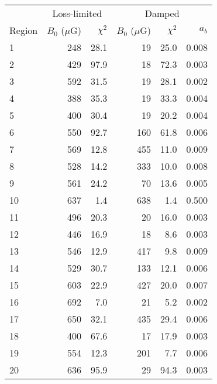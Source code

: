 \begin{tabular}{@{} l rr rrr @{}}
\toprule
{} & \multicolumn{2}{c}{Loss-limited}
   & \multicolumn{3}{c}{Damped} \\
\cmidrule(lr){2-3} \cmidrule(l){4-6}
Region & $B_0$ ($\mu$G) & $\chi^2$
       & $B_0$ ($\mu$G) & $\chi^2$ & $a_b$ \\
\midrule
 1 & 248 & 28.1 &  19 & 25.0 & 0.008 \\
 2 & 429 & 97.9 &  18 & 72.3 & 0.003 \\
 3 & 592 & 31.5 &  19 & 28.1 & 0.002 \\
\cmidrule{1-6}
 4 & 388 & 35.3 &  19 & 33.3 & 0.004 \\
 5 & 400 & 30.4 &  19 & 20.2 & 0.004 \\
 6 & 550 & 92.7 & 160 & 61.8 & 0.006 \\
 7 & 569 & 12.8 & 455 & 11.0 & 0.009 \\
 8 & 528 & 14.2 & 333 & 10.0 & 0.008 \\
 9 & 561 & 24.2 &  70 & 13.6 & 0.005 \\
10 & 637 &  1.4 & 638 &  1.4 & 0.500 \\
\cmidrule{1-6}
11 & 496 & 20.3 &  20 & 16.0 & 0.003 \\
12 & 446 & 16.9 &  18 &  8.6 & 0.003 \\
13 & 546 & 12.9 & 417 &  9.8 & 0.009 \\
\cmidrule{1-6}
14 & 529 & 30.7 & 133 & 12.1 & 0.006 \\
15 & 603 & 22.9 & 427 & 20.0 & 0.007 \\
16 & 692 &  7.0 &  21 &  5.2 & 0.002 \\
17 & 650 & 32.1 & 435 & 29.4 & 0.006 \\
\cmidrule{1-6}
18 & 400 & 67.6 &  17 & 17.9 & 0.003 \\
19 & 554 & 12.3 & 201 &  7.7 & 0.006 \\
20 & 636 & 95.9 &  29 & 94.3 & 0.003 \\
\bottomrule
\end{tabular}
